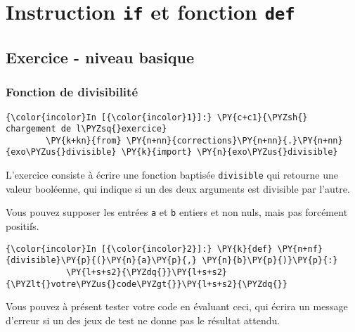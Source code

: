     
    
    
    

    

    \hypertarget{instruction-if-et-fonction-def}{%
\section{\texorpdfstring{Instruction \texttt{if} et fonction
\texttt{def}}{Instruction if et fonction def}}\label{instruction-if-et-fonction-def}}

    \hypertarget{exercice---niveau-basique}{%
\subsection{Exercice - niveau basique}\label{exercice---niveau-basique}}

    \hypertarget{fonction-de-divisibilituxe9}{%
\subsubsection{Fonction de
divisibilité}\label{fonction-de-divisibilituxe9}}

    \begin{Verbatim}[commandchars=\\\{\}]
{\color{incolor}In [{\color{incolor}1}]:} \PY{c+c1}{\PYZsh{} chargement de l\PYZsq{}exercice}
        \PY{k+kn}{from} \PY{n+nn}{corrections}\PY{n+nn}{.}\PY{n+nn}{exo\PYZus{}divisible} \PY{k}{import} \PY{n}{exo\PYZus{}divisible}
\end{Verbatim}


    L'exercice consiste à écrire une fonction baptisée \texttt{divisible}
qui retourne une valeur booléenne, qui indique si un des deux arguments
est divisible par l'autre.

Vous pouvez supposer les entrées \texttt{a} et \texttt{b} entiers et non
nuls, mais pas forcément positifs.

    \begin{Verbatim}[commandchars=\\\{\}]
{\color{incolor}In [{\color{incolor}2}]:} \PY{k}{def} \PY{n+nf}{divisible}\PY{p}{(}\PY{n}{a}\PY{p}{,} \PY{n}{b}\PY{p}{)}\PY{p}{:}
            \PY{l+s+s2}{\PYZdq{}}\PY{l+s+s2}{\PYZlt{}votre\PYZus{}code\PYZgt{}}\PY{l+s+s2}{\PYZdq{}}
\end{Verbatim}


    Vous pouvez à présent tester votre code en évaluant ceci, qui écrira un
message d'erreur si un des jeux de test ne donne pas le résultat
attendu.


